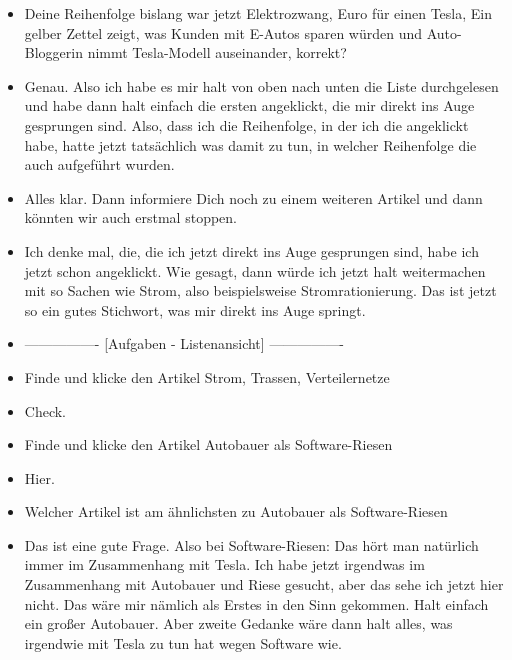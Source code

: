 {\begin{itemize}[]
    Nachdem ich die durch habe, würde ich dann halt in Richtung Strom gehen.
    Das wäre so mein Vorgehen, dass ich halt zuerst das, was wirklich direkt sich ums Auto dreht, anklicke und dann im Nachhinein halt alles, was mehr oder weniger indirekt damit zu tun hat.
    \item {} Deine Reihenfolge bislang war jetzt \flqq Elektrozwang\frqq{},  Euro für einen Tesla\frqq{}, \flqq Ein gelber Zettel zeigt, was Kunden mit E-Autos sparen würden\frqq{} und \flqq Auto-Bloggerin nimmt Tesla-Modell auseinander\frqq{}, korrekt?
    \item {} Genau.
    Also ich habe es mir halt von oben nach unten die Liste durchgelesen und habe dann halt einfach die ersten angeklickt, die mir direkt ins Auge gesprungen sind.
    Also, dass ich die Reihenfolge, in der ich die angeklickt habe, hatte jetzt tatsächlich was damit zu tun, in welcher Reihenfolge die auch aufgeführt wurden.
    \item {} Alles klar. Dann informiere Dich noch zu einem weiteren Artikel und dann könnten wir auch erstmal stoppen.
    \item {} Ich denke mal, die, die ich jetzt direkt ins Auge gesprungen sind, habe ich jetzt schon angeklickt.
    Wie gesagt, dann würde ich jetzt halt weitermachen mit so Sachen wie Strom, also beispielsweise \flqq Stromrationierung\frqq{}. Das ist jetzt so ein gutes Stichwort, was mir direkt ins Auge springt.
    \item {----------------} [Aufgaben - Listenansicht] {----------------}
    \item {} Finde und klicke den Artikel \flqq Strom, Trassen, Verteilernetze\frqq{}
    \item {} Check.
    \item {} Finde und klicke den Artikel \flqq Autobauer als Software-Riesen\frqq{}
    \item {} Hier.
    \item {} Welcher Artikel ist am ähnlichsten zu \flqq Autobauer als Software-Riesen\frqq{}
    \item {} Das ist eine gute Frage. 
    Also bei Software-Riesen: Das hört man natürlich immer im Zusammenhang mit Tesla.
    Ich habe jetzt irgendwas im Zusammenhang mit Autobauer und Riese gesucht, aber das sehe ich jetzt hier nicht.
    Das wäre mir nämlich als Erstes in den Sinn gekommen.
    Halt einfach ein großer Autobauer.
    Aber zweite Gedanke wäre dann halt alles, was irgendwie mit Tesla zu tun hat wegen Software wie.

\end{itemize}}
